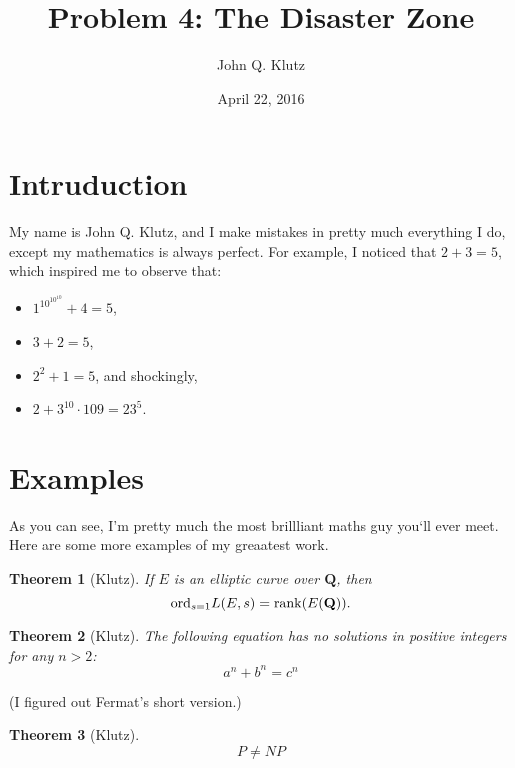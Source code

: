 \documentclass{article}
\title{Problem 4: The Disaster Zone}
\author{John Q. Klutz}
\date{April 22, 2016}
\newtheorem{theorem}{Theorem}
\begin{document}
\maketitle

\section{Intruduction}
My name is John Q. Klutz, and I make mistakes in pretty
much everything I do, except my mathematics is always perfect.
For example, I noticed that $2 + 3 = 5$, which inspired
me to observe that:
\begin{itemize}
\item $1^{10^{10^{10}}} + 4 = 5$,
\item $3 + 2 = 5$,
\item $2^2 + 1 = 5$, and shockingly,
\item $2 + 3^{10}\cdot 109  = 23^5$.
\end{itemize}

\section{Examples}
As you can see, I'm pretty much the most brillliant maths guy you`ll ever meet. Here are some more examples of my greaatest work.

\begin{theorem}[Klutz]
If $E$ is an elliptic curve over $\mathbf{Q}$, then
$$
  {\rm ord}_{s=1} L(E,s) = {\rm rank}(E(\mathbf{Q})).
$$
\end{theorem}


\begin{theorem}[Klutz]
The following equation has no solutions in positive integers for any $n > 2$:
\[a^n + b^n = c^n\]
\end{theorem}
(I figured out Fermat's short version.)

\begin{theorem}[Klutz]
\[P \neq  NP\]
\end{theorem}
\end{document}
